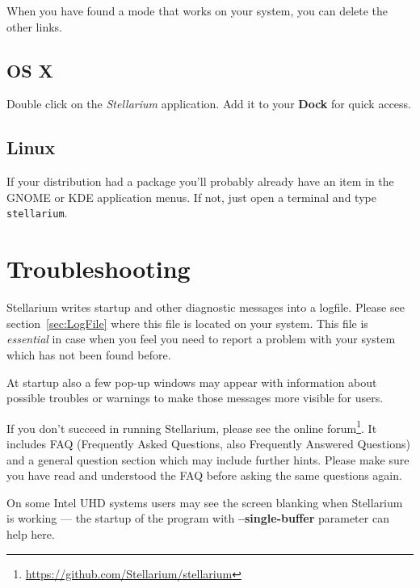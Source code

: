 When you have found a mode that works on your system, you can delete
the other links.

\subsection{OS X}
\label{sec:GettingStarted:Running:MacOSX}

Double click on the \emph{Stellarium} application.  Add it to your
\textbf{Dock} for quick access.

\subsection{Linux}
\label{sec:GettingStarted:Running:Linux}

If your distribution had a package you'll probably already have an
item in the GNOME or KDE application menus. If not, just open a
terminal and type \texttt{stellarium}.


\section{Troubleshooting}
\label{sec:GettingStarted:Running:Troubleshooting}

Stellarium writes startup and other diagnostic messages into a
logfile. Please see section~\ref{sec:LogFile} where this
file is located on your system. This file is \emph{essential} in case when
you feel you need to report a problem with your system which has not
been found before.

At startup also a few pop-up windows may appear
with information about possible troubles or warnings to make those
messages more visible for users.

If you don't succeed in running Stellarium, please see the online
forum\footnote{\url{https://github.com/Stellarium/stellarium}}.  It includes
FAQ (Frequently Asked Questions, also Frequently Answered
Questions) and a general question section which may include
further hints. Please make sure you have read and understood the FAQ
before asking the same questions again.

On some Intel UHD systems %
users may see the screen blanking when Stellarium is working --- the startup of the program with \textbf{--single-buffer} parameter can help here.



